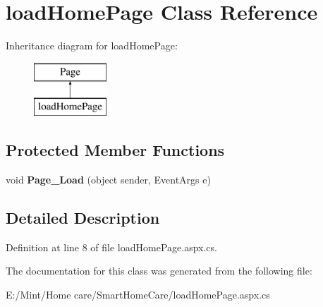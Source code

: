 \hypertarget{classload_home_page}{\section{load\-Home\-Page Class Reference}
\label{classload_home_page}
}
Inheritance diagram for load\-Home\-Page\-:\begin{figure}[H]
\begin{center}
\leavevmode
\includegraphics[height=2.000000cm]{classload_home_page}
\end{center}
\end{figure}
\subsection*{Protected Member Functions}
\begin{DoxyCompactItemize}
\item 
\hypertarget{classload_home_page_aa86ff482f8d3d2eb3cfc6fc9f2916d0e}{void {\bfseries Page\-\_\-\-Load} (object sender, Event\-Args e)}\label{classload_home_page_aa86ff482f8d3d2eb3cfc6fc9f2916d0e}

\end{DoxyCompactItemize}


\subsection{Detailed Description}


Definition at line 8 of file load\-Home\-Page.\-aspx.\-cs.



The documentation for this class was generated from the following file\-:\begin{DoxyCompactItemize}
\item 
E\-:/\-Mint/\-Home care/\-Smart\-Home\-Care/load\-Home\-Page.\-aspx.\-cs\end{DoxyCompactItemize}
